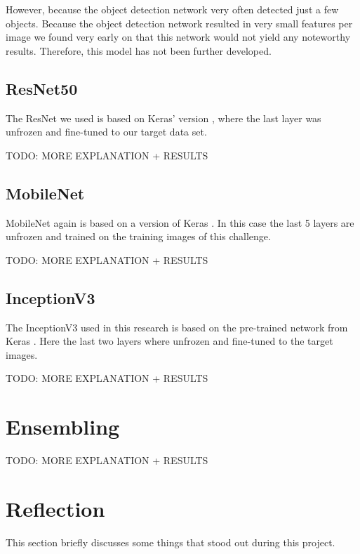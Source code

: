 \documentclass[10pt, a4paper]{article}
\begin{document}
\begin{multicols}{2}
		However, because the object detection network very often detected just a few objects. Because the object detection network resulted in very small features per image we found very early on that this network would not yield any noteworthy results. Therefore, this model has not been further developed.
		
		\subsection{ResNet50}
		The ResNet we used is based on Keras' version \cite{DBLP:journals/corr/HeZRS15}, where the last layer was unfrozen and fine-tuned to our target data set. 
		
		TODO: MORE EXPLANATION + RESULTS
		
		\subsection{MobileNet}
		MobileNet again is based on a version of Keras \cite{howard2017mobilenets}. In this case the last 5 layers are unfrozen and trained on the training images of this challenge.
		
		TODO: MORE EXPLANATION + RESULTS
		
		\subsection{InceptionV3}
		The InceptionV3 used in this research is based on the pre-trained network from Keras \cite{DBLP:journals/corr/SzegedyVISW15}. Here the last two layers where unfrozen and fine-tuned to the target images.
		
		TODO: MORE EXPLANATION + RESULTS
		
		\section{Ensembling}
		
		TODO: MORE EXPLANATION + RESULTS
	
		\section{Reflection}
		This section briefly discusses some things that stood out during this project.
	    
	
	
	\end{multicols}
	
\end{document}
